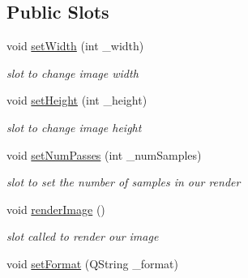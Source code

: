 \subsection*{Public Slots}
\begin{DoxyCompactItemize}
\item 
\hypertarget{class_render_settings_a58ccfc9cdf9b65274c3ec740d44313e8}{void \hyperlink{class_render_settings_a58ccfc9cdf9b65274c3ec740d44313e8}{set\-Width} (int \-\_\-width)}\label{class_render_settings_a58ccfc9cdf9b65274c3ec740d44313e8}

\begin{DoxyCompactList}\small\item\em slot to change image width \end{DoxyCompactList}\item 
\hypertarget{class_render_settings_a66eb86b4aedb8d2da90b2265c781193e}{void \hyperlink{class_render_settings_a66eb86b4aedb8d2da90b2265c781193e}{set\-Height} (int \-\_\-height)}\label{class_render_settings_a66eb86b4aedb8d2da90b2265c781193e}

\begin{DoxyCompactList}\small\item\em slot to change image height \end{DoxyCompactList}\item 
\hypertarget{class_render_settings_ae108345c2da45e68b88fc68f1b58d62d}{void \hyperlink{class_render_settings_ae108345c2da45e68b88fc68f1b58d62d}{set\-Num\-Passes} (int \-\_\-num\-Samples)}\label{class_render_settings_ae108345c2da45e68b88fc68f1b58d62d}

\begin{DoxyCompactList}\small\item\em slot to set the number of samples in our render \end{DoxyCompactList}\item 
\hypertarget{class_render_settings_a548914e7dc30c7c407836d0d90f05700}{void \hyperlink{class_render_settings_a548914e7dc30c7c407836d0d90f05700}{render\-Image} ()}\label{class_render_settings_a548914e7dc30c7c407836d0d90f05700}

\begin{DoxyCompactList}\small\item\em slot called to render our image \end{DoxyCompactList}\item 
\hypertarget{class_render_settings_aa87c822ab21278b267dd220a53c59f67}{void \hyperlink{class_render_settings_aa87c822ab21278b267dd220a53c59f67}{set\-Format} (Q\-String \-\_\-format)}\label{class_render_settings_aa87c822ab21278b267dd220a53c59f67}


\end{DoxyCompactItemize}
